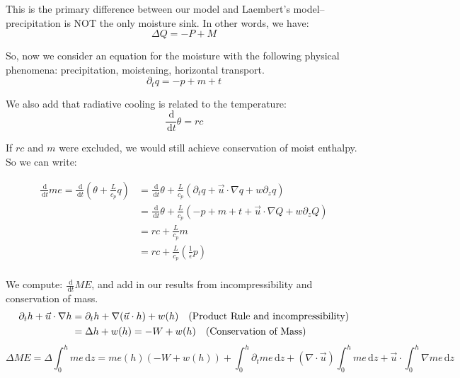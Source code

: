 \documentclass[10pt]{article}
\newcommand{\rmd}{\,\mathrm{d}}
\begin{document}
This is the primary difference between our model and Laembert's model-- precipitation is NOT the only moisture sink. In other words, we have:
\begin{equation}
\Delta Q = -P + M
\label{neweq}
\end{equation}

So, now we consider an equation for the moisture with the following physical phenomena: precipitation, moistening, horizontal transport.
\begin{equation}
\partial_t q = -p + m + t
\end{equation}

We also add that radiative cooling is related to the temperature: 
\begin{equation}
\frac{\rmd}{\rmd t}\theta = rc
\end{equation}

If $rc$ and $m$ were excluded, we would still achieve conservation of moist enthalpy. So we can write:

\begin{align*}
\frac{\rmd}{\rmd t} me = \frac{\rmd}{\rmd t}\left(\theta + \frac{L}{c_p}q\right) &= \frac{\rmd}{\rmd t}\theta + \frac{L}{c_p}\left(\partial_t q + \vec{u}\cdot \nabla q + w\partial_z q\right) \\
&= \frac{\rmd}{\rmd t}\theta + \frac{L}{c_p}\left(-p + m + t+ \vec{u}\cdot \nabla Q + w\partial_z Q\right) \\
&= rc +\frac{L}{c_p} m \\
&= rc +\frac{L}{c_p} \left(\frac{1}{\epsilon} p\right) \\
\end{align*}

We compute: $\frac{\rmd}{\rmd t} ME $, and add in our results from incompressibility and conservation of mass.
\begin{align*}
 \partial_t h +\vec{u}\cdot \nabla h &= \partial_t h +\nabla(\vec{u}\cdot h) + w(h) \text{\quad (Product Rule and incompressibility)}\\
 &= \Delta h + w(h) = -W + w(h)\text{\quad (Conservation of Mass) }
 \end{align*}
 \begin{equation}
\Delta ME = \Delta \int_{0}^{h} me \rmd z= me(h)\left( -W + w(h) \right) + \int_{0}^{h} \partial_tme \rmd z + \left(\nabla \cdot\vec{u} \right)\int_{0}^{h} me \rmd z + \vec{u}\cdot \int_{0}^{h}\nabla me \rmd z 
 \label{eqdt}
\end{equation}
  
\end{document}

